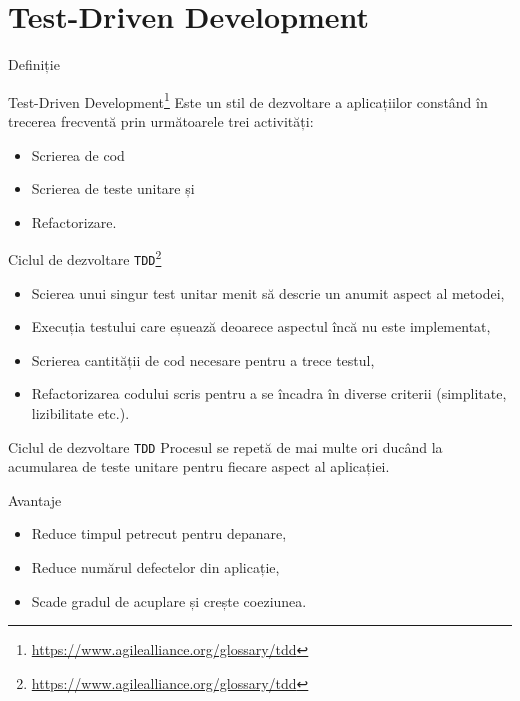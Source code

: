 \documentclass[presentation]{beamer}
\begin{document}
\section{Test-Driven Development}
\label{sec:org6bca3ba}
\begin{frame}[label={sec:org97005cb}]{Definiție}
\begin{block}{Test-Driven Development\footnote{\url{https://www.agilealliance.org/glossary/tdd}}}
Este un stil de dezvoltare a aplicațiilor constând în trecerea frecventă prin următoarele trei activități:
\begin{itemize}
\item Scrierea de cod
\item Scrierea de teste unitare și
\item Refactorizare.
\end{itemize}
\end{block}
\end{frame}
\begin{frame}[label={sec:orgf9e52b7},fragile]{Ciclul de dezvoltare \texttt{TDD}\footnote{\url{https://www.agilealliance.org/glossary/tdd}}}
 \begin{itemize}
\item Scierea unui singur test unitar menit să descrie un anumit aspect al metodei,
\item Execuția testului care eșuează deoarece aspectul încă nu este implementat,
\item Scrierea cantității de cod necesare pentru a trece testul,
\item Refactorizarea codului scris pentru a se încadra în diverse criterii (simplitate, lizibilitate etc.).
\end{itemize}
\end{frame}
\begin{frame}[label={sec:org94c78e5},fragile]{Ciclul de dezvoltare \texttt{TDD}}
 Procesul se repetă de mai multe ori ducând la acumularea de teste unitare pentru fiecare aspect al aplicației.
\end{frame}
\begin{frame}[label={sec:org23aaa28}]{Avantaje}
\begin{itemize}
\item Reduce timpul petrecut pentru depanare,
\item Reduce numărul defectelor din aplicație,
\item Scade gradul de acuplare și crește coeziunea.
\end{itemize}
\end{frame}
\end{document}
